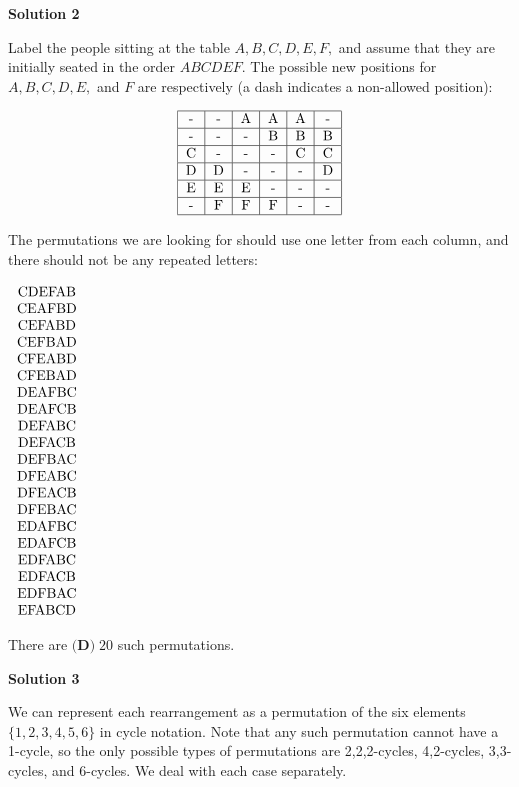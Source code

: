 \begin{enumerate}
 



\textbf{Solution 2}

Label the people sitting at the table $A, B, C, D, E, F,$ and assume that they are initially seated in the order $ABCDEF$. The possible new positions for $A, B, C, D, E,$ and $F$ are respectively (a dash indicates a non-allowed position):

 
 \[\begin{tabular}{| c | c | c | c | c | c |} \hline - & - & A & A & A & - \\ \hline - & - & - & B & B & B \\ \hline C & - & - & - & C & C \\ \hline D & D & - & - & - & D \\ \hline E & E & E & - & - & - \\ \hline - & F & F & F & - & - \\ \hline \end{tabular}\]

 The permutations we are looking for should use one letter from each column, and there should not be any repeated letters:

 $\begin{tabular}{c} CDEFAB \\ CEAFBD \\ CEFABD \\ CEFBAD \\ CFEABD \\ CFEBAD \\ DEAFBC \\ DEAFCB \\ DEFABC \\ DEFACB \\ DEFBAC \\ DFEABC \\ DFEACB \\ DFEBAC \\ EDAFBC \\ EDAFCB \\ EDFABC \\ EDFACB \\ EDFBAC \\ EFABCD \end{tabular}$

 There are $\boxed{\textbf{(D)}\; 20}$ such permutations.

 



\textbf{Solution 3}

We can represent each rearrangement as a permutation of the six elements $\{1,2,3,4,5,6\}$ in cycle notation. Note that any such permutation cannot have a 1-cycle, so the only possible types of permutations are 2,2,2-cycles, 4,2-cycles, 3,3-cycles, and 6-cycles. We deal with each case separately.


\end{enumerate}

